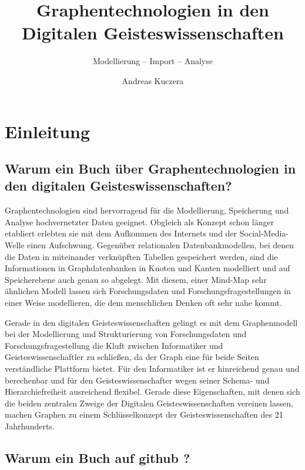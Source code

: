 \documentclass[ngerman,]{scrreprt}
\title{Graphentechnologien in den Digitalen Geisteswissenschaften}
\subtitle{Modellierung -- Import -- Analyse}
\author{Andreas Kuczera}
\date{}
\begin{document}
\maketitle

{
\hypersetup{linkcolor=black}
\setcounter{tocdepth}{2}
\tableofcontents
}
\chapter{Einleitung}\label{einleitung}

\section{Warum ein Buch über Graphentechnologien in den digitalen Geisteswissenschaften?}\label{warum-ein-buch-uxfcber-graphentechnologien-in-den-digitalen-geisteswissenschaften}

Graphentechnologien sind hervorragend für die Modellierung, Speicherung und Analyse hochvernetzter Daten geeignet. Obgleich als Konzept schon länger etabliert erlebten sie mit dem Aufkommen des Internets und der Social-Media-Welle einen Aufschwung. Gegenüber relationalen Datenbankmodellen, bei denen die Daten in miteinander verknüpften Tabellen gespeichert werden, sind die Informationen in Graphdatenbanken in Knoten und Kanten modelliert und auf Speicherebene auch genau so abgelegt. Mit diesem, einer Mind-Map sehr ähnlichen Modell lassen sich Forschungsdaten und Forschungsfragestellungen in einer Weise modellieren, die dem menschlichen Denken oft sehr nahe kommt.

Gerade in den digitalen Geisteswissenschaften gelingt es mit dem Graphenmodell bei der Modellierung und Strukturierung von Forschungsdaten und Forschungsfragestellung die Kluft zwischen Informatiker und Geisteswissenschaftler zu schließen, da der Graph eine für beide Seiten verständliche Plattform bietet. Für den Informatiker ist er hinreichend genau und berechenbar und für den Geisteswissenschafter wegen seiner Schema- und Hierarchiefreiheit ausreichend flexibel. Gerade diese Eigenschaften, mit denen sich die beiden zentralen Zweige der Digitalen Geisteswissenschaften vereinen lassen, machen Graphen zu einem Schlüsselkonzept der Geisteswissenschaften des 21 Jahrhunderts.

\section{Warum ein Buch auf github ?}\label{warum-ein-buch-auf-github}
\end{document}

